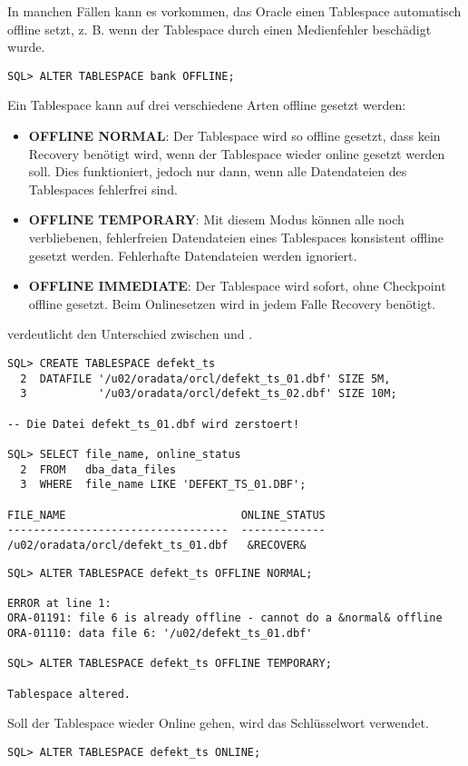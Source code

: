           In manchen F\"allen kann es vorkommen, das Oracle einen Tablespace automatisch offline setzt, z. B. wenn der Tablespace durch einen Medienfehler besch\"adigt wurde.
          \begin{lstlisting}[caption={Einen Tablespace offline setzen},label=admin111,language=oracle_sql]
SQL> ALTER TABLESPACE bank OFFLINE;
          \end{lstlisting}
          Ein Tablespace kann auf drei verschiedene Arten offline gesetzt werden:
          \begin{itemize}
            \item \textbf{OFFLINE NORMAL}: Der Tablespace wird so offline gesetzt, dass kein Recovery ben\"otigt wird, wenn der Tablespace wieder online gesetzt werden soll. Dies funktioniert, jedoch nur dann, wenn alle Datendateien des Tablespaces fehlerfrei sind.
            \item \textbf{OFFLINE TEMPORARY}: Mit diesem Modus k\"onnen alle noch verbliebenen, fehlerfreien Datendateien eines Tablespaces konsistent offline gesetzt werden. Fehlerhafte Datendateien werden ignoriert.
            \item \textbf{OFFLINE IMMEDIATE}: Der Tablespace wird sofort, ohne Checkpoint offline gesetzt. Beim Onlinesetzen wird in jedem Falle Recovery ben\"otigt.
          \end{itemize}
           verdeutlicht den Unterschied zwischen  und .
          \begin{lstlisting}[caption={Der Unterschied zwischen NORMAL und TEMPORARY},label=admin112,language=oracle_sql]
SQL> CREATE TABLESPACE defekt_ts
  2  DATAFILE '/u02/oradata/orcl/defekt_ts_01.dbf' SIZE 5M,
  3           '/u03/oradata/orcl/defekt_ts_02.dbf' SIZE 10M;

-- Die Datei defekt_ts_01.dbf wird zerstoert!

SQL> SELECT file_name, online_status
  2  FROM   dba_data_files
  3  WHERE  file_name LIKE 'DEFEKT_TS_01.DBF';

FILE_NAME                           ONLINE_STATUS
----------------------------------  -------------
/u02/oradata/orcl/defekt_ts_01.dbf   &RECOVER&
          \end{lstlisting}
\clearpage
          \begin{lstlisting}[language=oracle_sql,alsolanguage=sqlplus]
SQL> ALTER TABLESPACE defekt_ts OFFLINE NORMAL;

ERROR at line 1:
ORA-01191: file 6 is already offline - cannot do a &normal& offline
ORA-01110: data file 6: '/u02/defekt_ts_01.dbf'

SQL> ALTER TABLESPACE defekt_ts OFFLINE TEMPORARY;

Tablespace altered.
          \end{lstlisting}
          Soll der Tablespace wieder Online gehen, wird das Schl\"usselwort  verwendet.
          \begin{lstlisting}[caption={Einen Tablespace online setzen},label=admin113,language=oracle_sql]
SQL> ALTER TABLESPACE defekt_ts ONLINE;
          \end{lstlisting}
